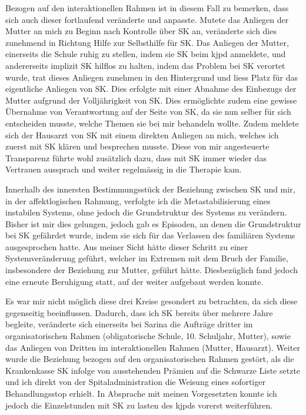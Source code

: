 Bezogen auf den interaktionellen Rahmen ist in diesem Fall zu bemerken, dass sich auch dieser fortlaufend veränderte und anpasste. Mutete das Anliegen der Mutter an mich zu Beginn nach Kontrolle über SK an, veränderte sich dies zunehmend in Richtung Hilfe zur Selbsthilfe für SK. Das Anliegen der Mutter, einerseits die Schule ruhig zu stellen, indem sie SK beim \ac{kjpd} anmeldete, und andererseits implizit SK hilflos zu halten, indem das Problem bei SK verortet wurde, trat dieses Anliegen zunehmen in den Hintergrund und liess Platz für das eigentliche Anliegen von SK. Dies erfolgte mit einer Abnahme des Einbezugs der Mutter aufgrund der Volljährigkeit von SK. Dies ermöglichte zudem eine gewisse Übernahme von Verantwortung auf der Seite von SK, da sie nun selber für sich entscheiden musste, welche Themen sie bei mir behandeln wollte. Zudem meldete sich der Hausarzt von SK mit einem direkten Anliegen an mich, welches ich zuerst mit SK klären und besprechen musste. Diese von mir angesteuerte Transparenz führte wohl zusätzlich dazu, dass mit SK immer wieder das Vertrauen aussprach und weiter regelmässig in die Therapie kam. 

Innerhalb des innersten Bestimmungsstück der Beziehung zwischen SK und mir, in der affektlogischen Rahmung, verfolgte ich die Metastabilisierung eines instabilen Systems, ohne jedoch die Grundstruktur des Systems zu verändern. Bisher ist mir dies gelungen, jedoch gab es Episoden, an denen die Grundstruktur bei SK gefährdet wurde, indem sie sich für das Verlassen des familiären Systems ausgesprochen hatte. Aus meiner Sicht hätte dieser Schritt zu einer Systemveränderung geführt, welcher im Extremen mit dem Bruch der Familie, insbesondere der Beziehung zur Mutter, geführt hätte. Diesbezüglich fand jedoch eine erneute Beruhigung statt, auf der weiter aufgebaut werden konnte. 

Es war mir nicht möglich diese drei Kreise gesondert zu betrachten, da sich diese  gegenseitig beeinflussen. Dadurch, dass ich SK bereits über mehrere Jahre begleite, veränderte sich einerseits bei Sarina die Aufträge dritter im organisatorischen Rahmen (obligatorische Schule, 10. Schuljahr, Mutter), sowie das Anliegen von Dritten im interaktionellen Rahmen (Mutter, Hausarzt). Weiter wurde die Beziehung bezogen auf den organisatorischen Rahmen gestört, als die Krankenkasse SK infolge von ausstehenden Prämien auf die Schwarze Liste setzte und ich direkt von der Spitaladministration die Weisung eines sofortiger Behandlungsstop erhielt. In Absprache mit meinen Vorgesetzten konnte ich jedoch die Einzelstunden mit SK zu lasten des \acp{kjpd} vorerst weiterführen. 

